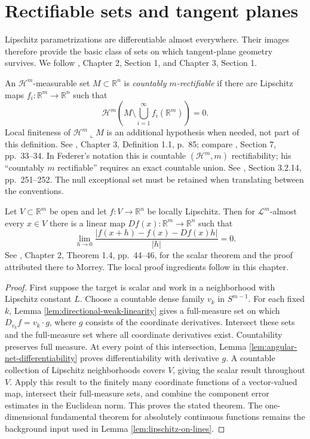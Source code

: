 \chapter{Rectifiable sets and tangent planes}\label{sec:rectifiable-sets}
Lipschitz parametrizations are differentiable almost everywhere. Their images therefore provide the basic class of sets on which tangent-plane geometry survives. We follow \cite{Sim18}, Chapter 2, Section 1, and Chapter 3, Section 1.

\begin{definition}\label{def:rectifiable-set}
An $\mathcal{H}^m$-measurable set $M\subset\mathbb{R}^n$ is \emph{countably $m$-rectifiable} if there are Lipschitz maps $f_i:\mathbb{R}^m\to\mathbb{R}^n$ such that
\[
 \mathcal{H}^m\left(M\setminus\bigcup_{i=1}^{\infty}f_i(\mathbb{R}^m)\right)=0.
\]
Local finiteness of $\mathcal{H}^m\llcorner M$ is an additional hypothesis when needed, not part of this definition. See \cite{Sim18}, Chapter 3, Definition 1.1, p.~85; compare \cite{WhiCho14}, Section 7, pp.~33--34. In Federer's notation this is countable $(\mathcal{H}^m,m)$ rectifiability; his ``countably $m$ rectifiable'' requires an exact countable union. See \cite{Fed69}, Section 3.2.14, pp.~251--252. The null exceptional set must be retained when translating between the conventions.
\end{definition}

\begin{theorem}[Rademacher]\label{thm:rademacher}
Let $V\subset\mathbb{R}^m$ be open and let $f:V\to\mathbb{R}^n$ be locally Lipschitz. Then for $\mathcal{L}^m$-almost every $x\in V$ there is a linear map $Df(x):\mathbb{R}^m\to\mathbb{R}^n$ such that
\[
 \lim_{h\to0}\frac{|f(x+h)-f(x)-Df(x)h|}{|h|}=0.
\]
See \cite{Sim18}, Chapter 2, Theorem 1.4, pp.~44--46, for the scalar theorem and the proof attributed there to Morrey. The local proof ingredients follow in this chapter.
\end{theorem}
\begin{proof}
First suppose the target is scalar and work in a neighborhood with Lipschitz constant $L$. Choose a countable dense family $v_k$ in $S^{m-1}$. For each fixed $k$, Lemma \ref{lem:directional-weak-linearity} gives a full-measure set on which $D_{v_k}f=v_k\cdot g$, where $g$ consists of the coordinate derivatives. Intersect these sets and the full-measure set where all coordinate derivatives exist. Countability preserves full measure. At every point of this intersection, Lemma \ref{lem:angular-net-differentiability} proves differentiability with derivative $g$. A countable collection of Lipschitz neighborhoods covers $V$, giving the scalar result throughout $V$. Apply this result to the finitely many coordinate functions of a vector-valued map, intersect their full-measure sets, and combine the component error estimates in the Euclidean norm. This proves the stated theorem. The one-dimensional fundamental theorem for absolutely continuous functions remains the background input used in Lemma \ref{lem:lipschitz-on-lines}.
\end{proof}


